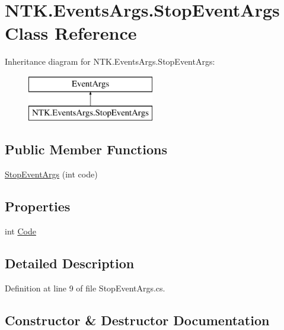 \hypertarget{class_n_t_k_1_1_events_args_1_1_stop_event_args}{}\section{N\+T\+K.\+Events\+Args.\+Stop\+Event\+Args Class Reference}
\label{class_n_t_k_1_1_events_args_1_1_stop_event_args}
Inheritance diagram for N\+T\+K.\+Events\+Args.\+Stop\+Event\+Args\+:\begin{figure}[H]
\begin{center}
\leavevmode
\includegraphics[height=2.000000cm]{df/df7/class_n_t_k_1_1_events_args_1_1_stop_event_args}
\end{center}
\end{figure}
\subsection*{Public Member Functions}
\begin{DoxyCompactItemize}
\item 
\mbox{\hyperlink{class_n_t_k_1_1_events_args_1_1_stop_event_args_af33cdd1918a0304b676c0fc5e7cd14e5}{Stop\+Event\+Args}} (int code)
\end{DoxyCompactItemize}
\subsection*{Properties}
\begin{DoxyCompactItemize}
\item 
int \mbox{\hyperlink{class_n_t_k_1_1_events_args_1_1_stop_event_args_ab4a83a76d50f8049d7df310c1f1aa67a}{Code}}
\end{DoxyCompactItemize}


\subsection{Detailed Description}


Definition at line 9 of file Stop\+Event\+Args.\+cs.



\subsection{Constructor \& Destructor Documentation}
\mbox{\label{class_n_t_k_1_1_events_args_1_1_stop_event_args_af33cdd1918a0304b676c0fc5e7cd14e5}} 
